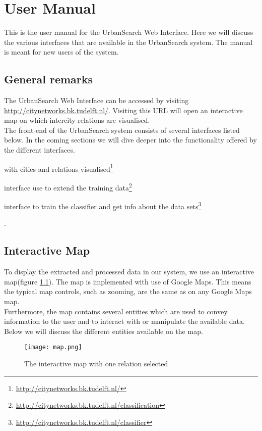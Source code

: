 \chapter{User Manual}
This is the user manual for the UrbanSearch Web Interface. Here we will discuss the various interfaces that are available in the UrbanSearch system. The manual is meant for new users of the system.

\section{General remarks}
The UrbanSearch Web Interface can be accessed by visiting \url{http://citynetworks.bk.tudelft.nl/}. Visiting this URL will open an interactive map on which intercity relations are visualised.\\
The front-end of the UrbanSearch system consists of several interfaces listed below. In the coming sections we will dive deeper into the functionality offered by the different interfaces.

\begin{description}[align=left]
\item [Interactive Map] with cities and relations visualised\footnote{\url{http://citynetworks.bk.tudelft.nl/}}
\item [Classification] interface use to extend the training data\footnote{\url{http://citynetworks.bk.tudelft.nl/classification}}
\item [Classifier] interface to train the classifier and get info about the data sets\footnote{\url{http://citynetworks.bk.tudelft.nl/classifier}}
\end{description}. 


\section{Interactive Map}

To display the extracted and processed data in our system, we use an interactive map(figure \ref{fig:map}). The map is implemented with use of Google Maps. This means the typical map controls, such as zooming, are the same as on any Google Maps map.\\
Furthermore, the map contains several entities which are used to convey information to the user and to interact with or manipulate the available data.\\
Below we will discuss the different entities available on the map.
\begin{figure}[H]
    \centering
    \texttt{[image: map.png]}
    \caption{The interactive map with one relation selected}
    \label{fig:map}
\end{figure}

